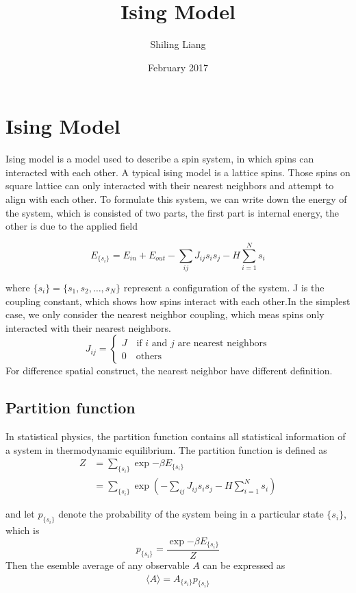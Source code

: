 \documentclass{article}
\title{Ising Model}
\author{Shiling Liang }
\date{February 2017}
\newcommand{\ave}[1]{\langle #1\rangle}
\newcommand{\si}{{\lbrace s_i\rbrace}}
\begin{document}
\maketitle


\section{Ising Model}
Ising model is a model used to describe a spin system, in which spins can interacted with each other. A typical ising model is a lattice spins. Those spins on square lattice can only interacted with their nearest neighbors and attempt to align with each other.
To formulate this system, we can write down the energy of the system, which is consisted of two parts, the first part is internal energy, the other is due to the applied field

\begin{equation}
E_\si=E_{in}+E_{out}-\sum_{ij}J_{ij}s_is_j-H\sum_{i=1}^{N}s_i
\end{equation}

where $\si=\{s_1,s_2,\dots,s_N\}$ represent a configuration of the system. J is the coupling constant, which shows how spins interact with each other.In the simplest case, we only consider the nearest neighbor coupling, which meas spins only interacted with their nearest neighbors.
\begin{displaymath}
	J_{ij}=
	\begin{cases}
		J\quad \text{if $i$ and $j$ are nearest neighbors}\\
		0\quad \text{others}
	\end{cases}
\end{displaymath}
For difference spatial construct, the nearest neighbor have different definition.  
\subsection{Partition function}
In statistical physics, the partition function contains all statistical information of a system in thermodynamic equilibrium.
The partition function is defined as
\begin{equation}
\begin{split}
    Z&=\sum_\si\exp{-\beta E_\si}\\
    &=\sum_\si\exp{(-\sum_{ij}J_{ij}s_is_j-H\sum_{i=1}^{N}s_i)}
\end{split}
\end{equation}

and let $p_\si$ denote the probability of the system being in a particular state $\si$, which is
\begin{equation}
p_\si=\frac{\exp{-\beta E_\si}}{Z}
\end{equation}
Then the esemble average of any observable $A$ can be expressed as
\begin{equation}
    \begin{split}
        \ave{A}=A_\si p_\si
    \end{split}
\end{equation}
\end{document}
